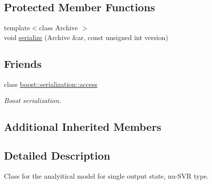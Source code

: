\subsection*{Protected Member Functions}
\begin{DoxyCompactItemize}
\item 
{\footnotesize template$<$class Archive $>$ }\\void \hyperlink{class_go_s_u_m_1_1_c_nu_svr_s_a_m_a5c67d2f1e31fc34fa5609f8d337afc6e}{serialize} (Archive \&ar, const unsigned int version)
\end{DoxyCompactItemize}
\subsection*{Friends}
\begin{DoxyCompactItemize}
\item 
class \hyperlink{class_go_s_u_m_1_1_c_nu_svr_s_a_m_ac98d07dd8f7b70e16ccb9a01abf56b9c}{boost\-::serialization\-::access}
\begin{DoxyCompactList}\small\item\em Boost serialization. \end{DoxyCompactList}\end{DoxyCompactItemize}
\subsection*{Additional Inherited Members}


\subsection{Detailed Description}
Class for the analyitical model for single output state, nu-\/\-S\-V\-R type. 

